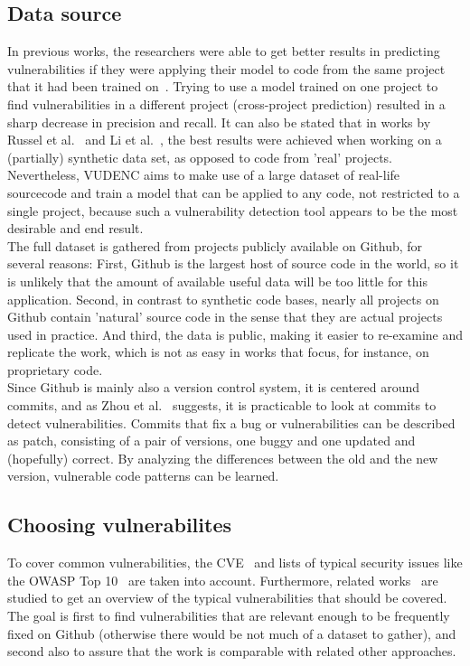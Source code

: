 \documentclass[
a4paper,
pagesize,
pdftex,
12pt,
twoside, %
BCOR=5mm, %
ngerman,
fleqn,
final,
]{scrartcl}
\begin{document}
	\subsection{Data source}
	In previous works, the researchers were able to get better results in predicting vulnerabilities if they were applying their model to code from the same project that it had been trained on~\cite{Pang.2015,Dam.2017}. Trying to use a model trained on one project to find vulnerabilities in a different project (cross-project prediction) resulted in a sharp decrease in precision and recall. It can also be stated that in works by Russel et al.~\cite{Russell.2018} and Li et al.~\cite{Li.2018}, the best results were achieved when working on a (partially) synthetic data set, as opposed to code from 'real' projects.\\
	Nevertheless, VUDENC aims to make use of a large dataset of real-life sourcecode and train a model that can be applied to any code, not restricted to a single project, because such a vulnerability detection tool appears to be the most desirable and end result.\\
	The full dataset is gathered from projects publicly available on Github, for several reasons: First, Github is the largest host of source code in the world, so it is unlikely that the amount of available useful data will be too little for this application. Second, in contrast to synthetic code bases, nearly all projects on Github contain 'natural' source code in the sense that they are actual projects used in practice. And third, the data is public, making it easier to re-examine and replicate the work, which is not as easy in works that focus, for instance, on proprietary code.\\
	Since Github is mainly also a version control system, it is centered around commits, and as Zhou et al.~\cite{Zhou.2017} suggests, it is practicable to look at commits to detect vulnerabilities. Commits that fix a bug or vulnerabilities can be described as patch, consisting of a pair of versions, one buggy and one updated and (hopefully) correct.  By analyzing the differences between the old and the new version, vulnerable code patterns can be learned. \\
	
	\subsection{Choosing vulnerabilites}
	To cover common vulnerabilities, the CVE~\cite{CVE} and lists of typical security issues like the OWASP Top 10~\cite{OWASPFoundation.} are taken into account. Furthermore, related works~\cite{Zhou.2017,Medeiros.2014,Yamaguchi.2012} are studied to get an overview of the typical vulnerabilities that should be covered. The goal is first to find vulnerabilities that are relevant enough to be frequently fixed on Github (otherwise there would be not much of a dataset to gather), and second also to assure that the work is comparable with related other approaches. 
	
\end{document}
